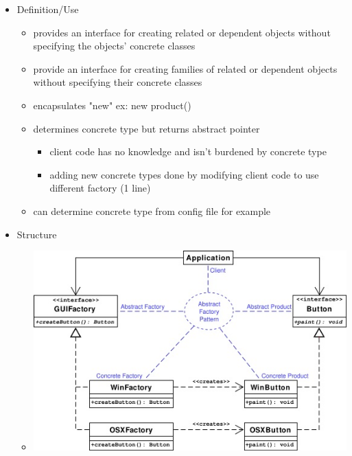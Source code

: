 \documentclass[11pt]{article}
\begin{document}
\begin{itemize}
   \item Definition/Use

   \begin{itemize}
     \item provides an interface for creating related or dependent objects without specifying the objects' concrete classes
     \item provide an interface for creating families of related or dependent objects without specifying their concrete classes
     \item encapsulates "new" ex: new product()
     \item determines concrete type but returns abstract pointer

     \begin{itemize}
       \item client code has no knowledge and isn't burdened by concrete type
       \item adding new concrete types done by modifying client code to use different factory (1 line)
     \end{itemize}

     \item can determine concrete type from config file for example
   \end{itemize}


   \item Structure

   \begin{itemize}
    \item \includegraphics{abstract_factory_class_diagram}
   \end{itemize}
\end{itemize}
\end{document}
